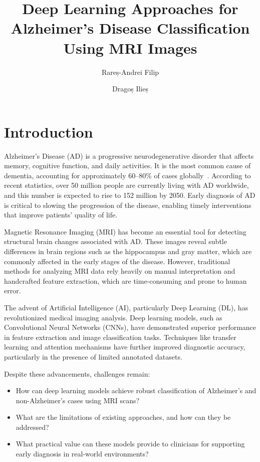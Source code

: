 \documentclass[runningheads]{llncs}
\title{Deep Learning Approaches for Alzheimer’s Disease Classification Using MRI Images}
\author{Rareș-Andrei Filip\inst{1} \and Dragoș Ilieș\inst{1}}
\institute{
Faculty of Economics and Business Administration (FSEGA), \\
Babeș-Bolyai University (UBB), Cluj-Napoca, Romania
}
\begin{document}
\maketitle

\begin{abstract}
\end{abstract}


\section{Introduction}

Alzheimer's Disease (AD) is a progressive neurodegenerative disorder that affects memory, cognitive function, and daily activities. It is the most common cause of dementia, accounting for approximately 60–80\% of cases globally~\cite{helaly2021}. According to recent statistics, over 50 million people are currently living with AD worldwide, and this number is expected to rise to 152 million by 2050. Early diagnosis of AD is critical to slowing the progression of the disease, enabling timely interventions that improve patients' quality of life.

Magnetic Resonance Imaging (MRI) has become an essential tool for detecting structural brain changes associated with AD. These images reveal subtle differences in brain regions such as the hippocampus and gray matter, which are commonly affected in the early stages of the disease. However, traditional methods for analyzing MRI data rely heavily on manual interpretation and handcrafted feature extraction, which are time-consuming and prone to human error.

The advent of Artificial Intelligence (AI), particularly Deep Learning (DL), has revolutionized medical imaging analysis. Deep learning models, such as Convolutional Neural Networks (CNNs), have demonstrated superior performance in feature extraction and image classification tasks. Techniques like transfer learning and attention mechanisms have further improved diagnostic accuracy, particularly in the presence of limited annotated datasets.

Despite these advancements, challenges remain:
\begin{itemize}
    \item How can deep learning models achieve robust classification of Alzheimer's and non-Alzheimer's cases using MRI scans?
    \item What are the limitations of existing approaches, and how can they be addressed?
    \item What practical value can these models provide to clinicians for supporting early diagnosis in real-world environments?
\end{itemize}
\end{document}
